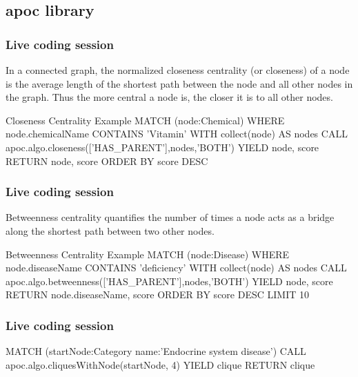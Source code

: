 \documentclass[12pt]{beamer}
\begin{document}
    \subsection{apoc library}
    \begin{frame}
        \frametitle{Live coding session}
        \begin{Definition}
            In a connected graph, the normalized closeness centrality (or closeness) of a node is the average length of the shortest path between the node and all other nodes in the graph. Thus the more central a node is, the closer it is to all other nodes.\footnotemark
        \end{Definition}
        \begin{block}{Closeness Centrality Example}
            MATCH (node:Chemical)
            WHERE node.chemicalName CONTAINS 'Vitamin'
            WITH collect(node) AS nodes
            CALL apoc.algo.closeness(['HAS\_PARENT'],nodes,'BOTH') YIELD node, score
            RETURN node, score
            ORDER BY score DESC
        \end{block}
    \end{frame}
    
    \begin{frame}
        \frametitle{Live coding session}
        \begin{Definition}
            Betweenness centrality quantifies the number of times a node acts as a bridge along the shortest path between two other nodes.\footnotemark
        \end{Definition}
        \begin{block}{Betweenness Centrality Example}
            MATCH (node:Disease)
            WHERE node.diseaseName CONTAINS 'deficiency'
            WITH collect(node) AS nodes
            CALL apoc.algo.betweenness(['HAS\_PARENT'],nodes,'BOTH') YIELD node, score
            RETURN node.diseaseName, score
            ORDER BY score DESC LIMIT 10
        \end{block}
    \end{frame}
    
    \begin{frame}
        \frametitle{Live coding session}
        MATCH (startNode:Category {name:'Endocrine system disease'})
        CALL apoc.algo.cliquesWithNode(startNode, 4) YIELD clique
        RETURN clique
    \end{frame}
    
\end{document}
